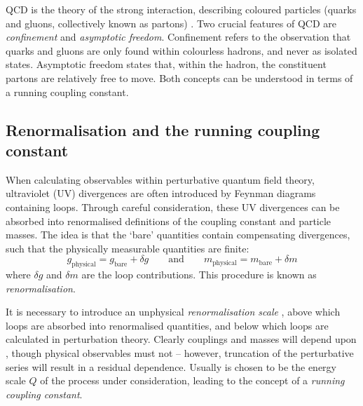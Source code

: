 
\ac{QCD} is the theory of the strong interaction, describing coloured particles (quarks 
and gluons, collectively known as partons) \cite{Ellis:1996}. Two crucial features of 
\ac{QCD} are \textit{confinement} and \textit{asymptotic freedom}. Confinement refers to 
the observation that quarks and gluons are only found within colourless hadrons, and 
never as isolated states. Asymptotic freedom states that, within the hadron, the 
constituent partons are relatively free to move. Both concepts can be understood in terms 
of a running coupling constant.



\subsection{Renormalisation and the running coupling constant}
\label{sec:qcd:renormalisation}

When calculating observables within perturbative quantum field theory, ultraviolet (UV) 
divergences are often introduced by Feynman diagrams containing loops. Through careful 
consideration, these UV divergences can be absorbed into renormalised definitions of the 
coupling constant and particle masses. The idea is that the `bare' quantities contain 
compensating divergences, such that the physically measurable quantities are finite:
\begin{equation}
	g_{\text{physical}} = g_{\text{bare}} + \delta g
	\quad\quad\text{and}\quad\quad
	m_{\text{physical}} = m_{\text{bare}} + \delta m
\end{equation}
where $\delta g$ and $\delta m$ are the loop contributions. This procedure is known as 
\textit{renormalisation}.

It is necessary to introduce an unphysical \textit{renormalisation scale} \mur, above 
which loops are absorbed into renormalised quantities, and below which loops are 
calculated in perturbation theory. Clearly couplings and masses will depend upon \mur,
though physical observables must not -- however, truncation of the perturbative series 
will result in a residual \mur dependence. Usually \mur is chosen to be the energy 
scale $Q$ of the process under consideration, leading to the concept of a \textit{running 
coupling constant}.

